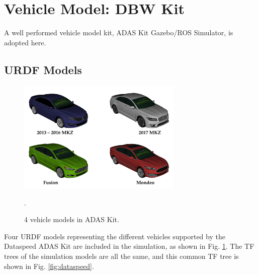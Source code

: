 \section{Vehicle Model: DBW Kit}

A well performed vehicle model kit, ADAS Kit Gazebo/ROS Simulator, is adopted here.

\subsection{URDF Models}

\begin{figure}[h]
\centering
\includegraphics[width=0.7\textwidth]{figs/ch2/mkz-cover}
\caption{4 vehicle models in ADAS Kit.}
\label{mkz-models}.
\end{figure}

Four URDF models representing the different vehicles supported by the Dataspeed ADAS Kit are included in the simulation, as shown in Fig. \ref{mkz-models}. The TF trees of the simulation models are all the same, and this common TF tree is shown in Fig. \ref{fig:dataspeed}.


